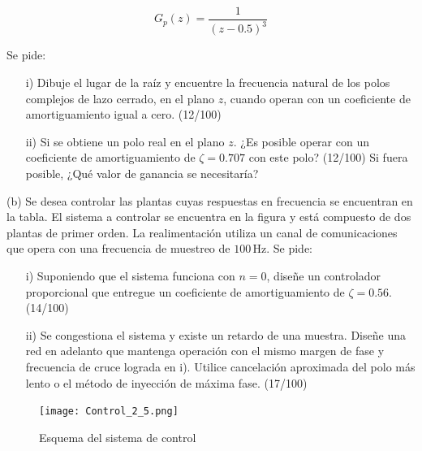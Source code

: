 \documentclass[
  11pt,
  letterpaper,
   addpoints,
   answers
  ]{exam}
\begin{document}
\begin{questions}
    \begin{equation}
        G_p(z) = \frac{1}{(z-0.5)^3} \tag{1}
    \end{equation}
    
    Se pide:
    
    \begin{enumerate}
        \item[i)] Dibuje el lugar de la raíz y encuentre la frecuencia natural de los polos complejos de lazo cerrado, en el plano $z$, cuando operan con un coeficiente de amortiguamiento igual a cero. (12/100)
        
        \item[ii)] Si se obtiene un polo real en el plano $z$. ¿Es posible operar con un coeficiente de amortiguamiento de $\zeta = 0.707$ con este polo? (12/100) Si fuera posible, ¿Qué valor de ganancia se necesitaría?
    \end{enumerate}
    
    (b) Se desea controlar las plantas cuyas respuestas en frecuencia se encuentran en la tabla. El sistema a controlar se encuentra en la figura y está compuesto de dos plantas de primer orden. La realimentación utiliza un canal de comunicaciones que opera con una frecuencia de muestreo de $100\,$Hz. Se pide:
    
    \begin{enumerate}
        \item[i)] Suponiendo que el sistema funciona con $n=0$, diseñe un controlador proporcional que entregue un coeficiente de amortiguamiento de $\zeta = 0.56$. (14/100)
        
        \item[ii)] Se congestiona el sistema y existe un retardo de una muestra. Diseñe una red en adelanto que mantenga operación con el mismo margen de fase y frecuencia de cruce lograda en i). Utilice cancelación aproximada del polo más lento o el método de inyección de máxima fase. (17/100)
    \end{enumerate}
    \begin{figure}[h!]
        \centering
        \texttt{[image: Control\_2\_5.png]}
        \caption{Esquema del sistema de control}
    \end{figure}
    

\end{questions}
\end{document}
